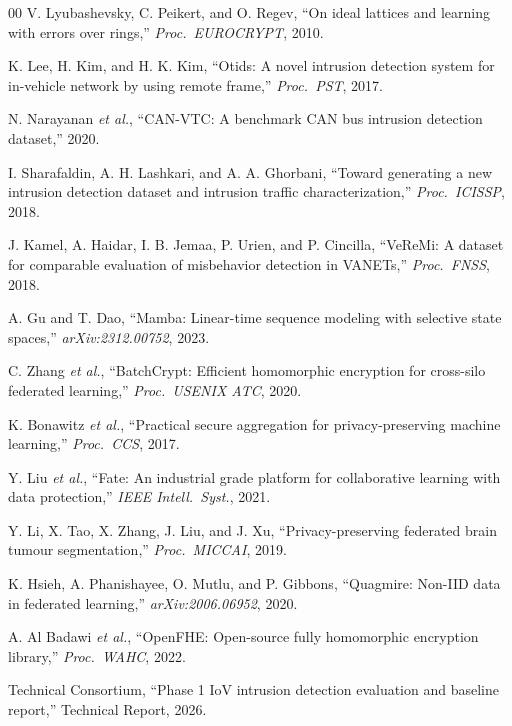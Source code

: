 \documentclass[conference]{IEEEtran}
\begin{document}
\begin{thebibliography}{00}
V. Lyubashevsky, C. Peikert, and O. Regev,
``On ideal lattices and learning with errors over rings,''
\textit{Proc.\ EUROCRYPT}, 2010.

K. Lee, H. Kim, and H. K. Kim,
``Otids: A novel intrusion detection system for in-vehicle network by using
remote frame,''
\textit{Proc.\ PST}, 2017.

N. Narayanan \textit{et al.},
``CAN-VTC: A benchmark CAN bus intrusion detection dataset,''
2020.

I. Sharafaldin, A. H. Lashkari, and A. A. Ghorbani,
``Toward generating a new intrusion detection dataset and intrusion traffic
characterization,''
\textit{Proc.\ ICISSP}, 2018.

J. Kamel, A. Haidar, I. B. Jemaa, P. Urien, and P. Cincilla,
``VeReMi: A dataset for comparable evaluation of misbehavior detection in
VANETs,''
\textit{Proc.\ FNSS}, 2018.

A. Gu and T. Dao,
``Mamba: Linear-time sequence modeling with selective state spaces,''
\textit{arXiv:2312.00752}, 2023.

C. Zhang \textit{et al.},
``BatchCrypt: Efficient homomorphic encryption for cross-silo federated
learning,''
\textit{Proc.\ USENIX ATC}, 2020.

K. Bonawitz \textit{et al.},
``Practical secure aggregation for privacy-preserving machine learning,''
\textit{Proc.\ CCS}, 2017.

Y. Liu \textit{et al.},
``Fate: An industrial grade platform for collaborative learning with data
protection,''
\textit{IEEE Intell.\ Syst.}, 2021.

Y. Li, X. Tao, X. Zhang, J. Liu, and J. Xu,
``Privacy-preserving federated brain tumour segmentation,''
\textit{Proc.\ MICCAI}, 2019.

K. Hsieh, A. Phanishayee, O. Mutlu, and P. Gibbons,
``Quagmire: Non-IID data in federated learning,''
\textit{arXiv:2006.06952}, 2020.

A. Al Badawi \textit{et al.},
``OpenFHE: Open-source fully homomorphic encryption library,''
\textit{Proc.\ WAHC}, 2022.

Technical Consortium,
``Phase 1 IoV intrusion detection evaluation and baseline report,''
Technical Report, 2026.

\end{thebibliography}
\end{document}
